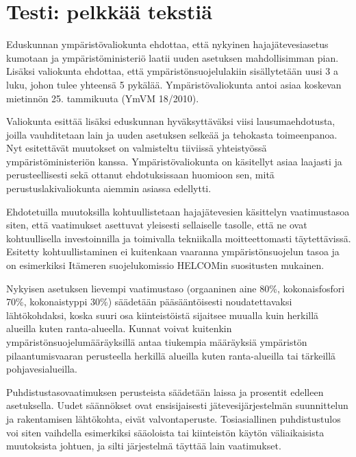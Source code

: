 %

\section{Testi: pelkkää tekstiä}

Eduskunnan ympäristövaliokunta ehdottaa, että nykyinen
hajajätevesiasetus kumotaan ja ympäristöministeriö laatii uuden
asetuksen mahdollisimman pian. Lisäksi valiokunta ehdottaa, että
ympäristönsuojelulakiin sisällytetään uusi 3 a luku, johon tulee
yhteensä 5 pykälää. Ympäristövaliokunta antoi asiaa koskevan mietinnön
25. tammikuuta (YmVM 18/2010).

Valiokunta esittää lisäksi eduskunnan hyväksyttäväksi viisi
lausumaehdotusta, joilla vauhditetaan lain ja uuden asetuksen selkeää
ja tehokasta toimeenpanoa. Nyt esitettävät muutokset on valmisteltu
tiiviissä yhteistyössä ympäristöministeriön
kanssa. Ympäristövaliokunta on käsitellyt asiaa laajasti ja
perusteellisesti sekä ottanut ehdotuksissaan huomioon sen, mitä
perustuslakivaliokunta aiemmin asiassa edellytti.

Ehdotetuilla muutoksilla kohtuullistetaan hajajätevesien käsittelyn
vaatimustasoa siten, että vaatimukset asettuvat yleisesti sellaiselle
tasolle, että ne ovat kohtuullisella investoinnilla ja toimivalla
tekniikalla moitteettomasti täytettävissä. Esitetty kohtuullistaminen
ei kuitenkaan vaaranna ympäristönsuojelun tasoa ja on esimerkiksi
Itämeren suojelukomissio HELCOMin suositusten mukainen.

Nykyisen asetuksen lievempi vaatimustaso (orgaaninen aine 80\%,
kokonaisfosfori 70\%, kokonaistyppi 30\%) säädetään pääsääntöisesti
noudatettavaksi lähtökohdaksi, koska suuri osa kiinteistöistä
sijaitsee muualla kuin herkillä alueilla kuten ranta-alueella. Kunnat
voivat kuitenkin ympäristönsuojelumääräyksillä antaa tiukempia
määräyksiä ympäristön pilaantumisvaaran perusteella herkillä alueilla
kuten ranta-alueilla tai tärkeillä pohjavesialueilla.

Puhdistustasovaatimuksen perusteista säädetään laissa ja prosentit
edelleen asetuksella. Uudet säännökset ovat ensisijaisesti
jätevesijärjestelmän suunnittelun ja rakentamisen lähtökohta, eivät
valvontaperuste. Tosiasiallinen puhdistustulos voi siten vaihdella
esimerkiksi sääoloista tai kiinteistön käytön väliaikaisista
muutoksista johtuen, ja silti järjestelmä täyttää lain vaatimukset.

